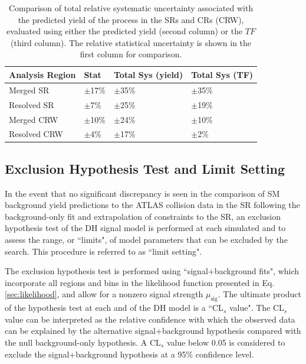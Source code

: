 \begin{table}[ht]
\begin{center}
\caption{\label{tab:TF_sys_comp} Comparison of total relative systematic uncertainty associated with the predicted yield of the \wjets process in the SRs and \wjets CRs (CRW), evaluated using either the predicted yield (second column) or the \(TF\) (third column). The relative statistical uncertainty is shown in the first column for comparison.}
\begin{tabular}{l l l l }
\toprule
\textbf{Analysis Region} &\textbf{Stat} &\textbf{Total Sys (yield)} & \textbf{Total Sys (TF)} \tabularnewline
\midrule
\midrule
Merged SR & \(\pm\)17\% & \(\pm\)35\% & \(\pm\)35\% \tabularnewline
\midrule
Resolved SR & \(\pm\)7\% & \(\pm\)25\% & \(\pm\)19\% \tabularnewline
\midrule
Merged CRW & \(\pm\)10\% & \(\pm\)24\% & \(\pm\)10\% \tabularnewline
\midrule
Resolved CRW & \(\pm\)4\% & \(\pm\)17\% & \(\pm\)2\% \tabularnewline
\bottomrule
\end{tabular}
\end{center}
\end{table}

\subsection{Exclusion Hypothesis Test and Limit Setting}
\label{sec:hypo_test}

In the event that no significant discrepancy is seen in the comparison of SM background yield predictions to the ATLAS collision data in the SR following the background-only fit and extrapolation of constraints to the SR, an exclusion hypothesis test of the DH signal model is performed at each simulated \ms and \mZp to assess the range, or ``limits", of model parameters that can be excluded by the search. This procedure is referred to as ``limit setting".

The exclusion hypothesis test is performed using ``signal+background fits", which incorporate all regions and bins in the likelihood function presented in Eq. \ref{sec:likelihood}, and allow for a nonzero signal strength \(\mu_\text{sig}\). The ultimate product of the hypothesis test at each \ms and \mZp of the DH model is a ``CL\(_s\) value". The CL\(_s\) value can be interpreted as the relative confidence with which the observed data can be explained by the alternative signal+background hypothesis compared with the null background-only hypothesis. A CL\(_s\) value below 0.05 is considered to exclude the signal+background hypothesis at a 95\% confidence level.

